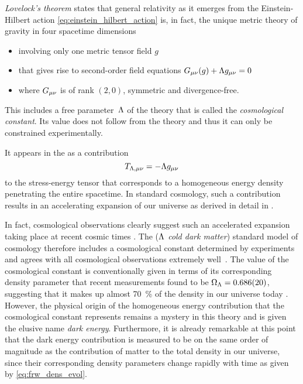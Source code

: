 \emph{Lovelock's theorem}\label{sec:lovelock} \autocite{Lovelock1971,Navarro2011,Clifton2012} states that general relativity as it emerges from the Einstein-Hilbert action \ref{eq:einstein_hilbert_action} is, in fact, the unique metric theory of gravity in four spacetime dimensions
\begin{itemize}
	\item involving only one metric tensor field \(g\)
	\item that gives rise to second-order field equations \(G_{\mu\nu}(g) + \Lambda g_{\mu\nu} = 0\)
	\item where \(G_{\mu\nu}\) is of rank \((2,0)\), symmetric and divergence-free.
\end{itemize}
This includes a free parameter~\(\Lambda\) of the theory that is called the \emph{cosmological constant}. Its value does not follow from the theory and thus it can only be constrained experimentally.

It appears in the  as a contribution
\begin{equation}
	T_{\Lambda\textnormal{,}\mu\nu} = - \Lambda g_{\mu\nu}
\end{equation}
to the stress-energy tensor that corresponds to a homogeneous energy density penetrating the entire spacetime. In standard \FLRW{} cosmology, such a contribution results in an accelerating expansion of our universe as derived in detail in .

In fact, cosmological observations clearly suggest such an accelerated expansion taking place at recent cosmic times \autocite{Perlmutter2003}. The \LCDM{} (\emph{\(\Lambda\) cold dark matter}) standard model of cosmology therefore includes a cosmological constant determined by experiments and agrees with all cosmological observations extremely well~\autocite{Planck2015}. The value of the cosmological constant is conventionally given in terms of its corresponding density parameter that recent measurements found to be \(\Omega_\Lambda = \SI{0.686+-0.020}{}\), suggesting that it makes up almost \SI{70}{\percent} of the density in our universe today \autocite{Planck2013Data}. However, the physical origin of the homogeneous energy contribution that the cosmological constant represents remains a mystery in this theory and is given the elusive name \emph{dark energy}. Furthermore, it is already remarkable at this point that the dark energy contribution is measured to be on the same order of magnitude as the contribution of matter to the total density in our universe, since their corresponding density parameters change rapidly with time as given by \eqref{eq:frw_dens_evol}.

